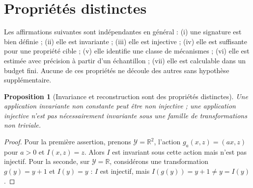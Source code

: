 \documentclass[11pt,oneside]{book}
\newtheorem{proposition}[theoreme]{Proposition}
\theoremstyle{definition}
\theoremstyle{remark}
\newcommand{\Ycal}{\mathcal Y}
\newcommand{\1}{\mathbf 1}
\begin{document}
\section{Propriétés distinctes}
Les affirmations suivantes sont indépendantes en général : (i) une signature est bien définie ; (ii) elle est invariante ; (iii) elle est injective ; (iv) elle est suffisante pour une propriété cible ; (v) elle identifie une classe de mécanismes ; (vi) elle est estimée avec précision à partir d'un échantillon ; (vii) elle est calculable dans un budget fini. Aucune de ces propriétés ne découle des autres sans hypothèse supplémentaire.

\begin{proposition}[Invariance et reconstruction sont des propriétés distinctes]
Une application invariante non constante peut être non injective ; une application injective n'est pas nécessairement invariante sous une famille de transformations non triviale.
\end{proposition}
\begin{proof}
Pour la première assertion, prenons $\Ycal=\mathbb R^2$, l'action $g_a(x,z)=(ax,z)$ pour $a>0$ et $I(x,z)=z$. Alors $I$ est invariant sous cette action mais n'est pas injectif. Pour la seconde, sur $\Ycal=\mathbb R$, considérons une transformation $g(y)=y+1$ et $I(y)=y$ : $I$ est injectif, mais $I(g(y))=y+1\ne y=I(y)$.\end{proof}
\end{document}
